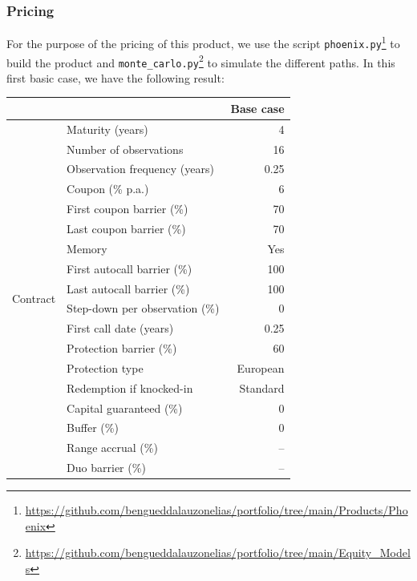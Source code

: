 \documentclass[11pt,a4paper]{article}
\begin{document}
\subsubsection{Pricing}

For the purpose of the pricing of this product, we use the script \texttt{phoenix.py}\footnote{\url{https://github.com/bengueddalauzonelias/portfolio/tree/main/Products/Phoenix}} to build the product and \texttt{monte\_carlo.py}\footnote{\url{https://github.com/bengueddalauzonelias/portfolio/tree/main/Equity_Models}} to simulate the different paths. In this first basic case, we have the following result:

\begin{table}[htbp]
  \centering
  \small
  \begin{tabular}{llr}
    \toprule
     & & \textbf{Base case} \\
    \midrule
    \multirow{21}{*}{Contract}
      & Maturity (years)                    & 4 \\
      & Number of observations              & 16 \\
      & Observation frequency (years)       & 0.25 \\
      & Coupon (\% p.a.)                    & 6 \\
      & First coupon barrier (\%)           & 70 \\
      & Last coupon barrier (\%)            & 70 \\
      & Memory                              & Yes \\
      & First autocall barrier (\%)         & 100 \\
      & Last autocall barrier (\%)          & 100 \\
      & Step-down per observation (\%)      & 0 \\
      & First call date (years)             & 0.25 \\
      & Protection barrier (\%)             & 60 \\
      & Protection type                     & European \\
      & Redemption if knocked-in            & Standard \\
      & Capital guaranteed (\%)             & 0 \\
      & Buffer (\%)                         & 0 \\
      & Range accrual (\%)                  & -- \\
      & Duo barrier (\%)                    & -- \\

\end{tabular}
\end{table}
\end{document}
